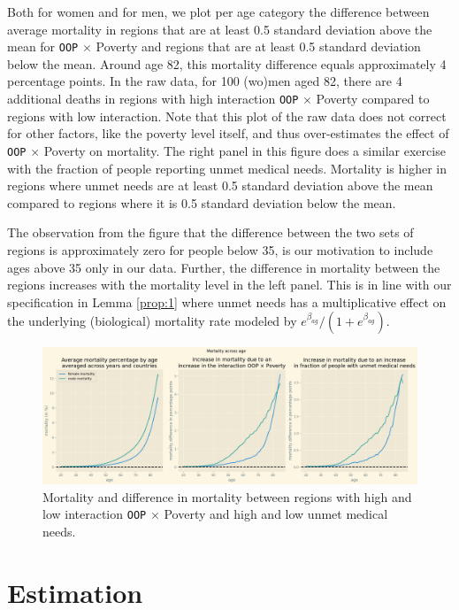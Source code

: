 \documentclass[a4paper,12pt]{article}
\begin{document}
Both for women and for men, we plot per age category the difference between average mortality in regions that are at least 0.5 standard deviation above the mean for \texttt{OOP} \(\times\) Poverty and regions that are at least 0.5 standard deviation below the mean. Around age 82, this mortality difference equals approximately 4 percentage points. In the raw data, for 100 (wo)men aged 82, there are 4 additional deaths in regions with high interaction \texttt{OOP} \(\times\) Poverty compared to regions with low interaction. Note that this plot of the raw data does not correct for other factors, like the poverty level itself, and thus over-estimates the effect of \texttt{OOP} \(\times\) Poverty on mortality. The right panel in this figure does a similar exercise with the fraction of people reporting unmet medical needs. Mortality is higher in regions where unmet needs are at least 0.5 standard deviation above the mean compared to regions where it is 0.5 standard deviation below the mean.

The observation from the figure that the difference between the two sets of regions is approximately zero for people below 35, is our motivation to include ages above 35 only in our data. Further, the difference in mortality between the regions increases with the mortality level in the left panel. This is in line with our specification in Lemma \ref{prop:1} where unmet needs has a multiplicative effect on the underlying (biological) mortality rate modeled by \(e^{\beta_{ag}}/(1+e^{\beta_{ag}})\).


\begin{figure}[htbp]
\centering
\includegraphics[width=.9\linewidth]{./figures/IncreaseMortalityInteractionData.png}
\caption{\label{fig:DifferenceMortalityData}Mortality and difference in mortality between regions with high and low interaction \texttt{OOP} \(\times\) Poverty and high and low unmet medical needs.}
\end{figure}



\section{Estimation}
\label{sec:orgcff3a48}
\label{sec:estimation}
\end{document}
